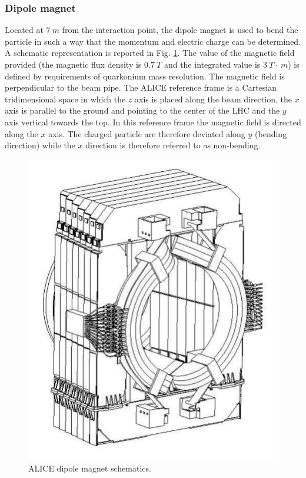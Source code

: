 \subsubsection{Dipole magnet}
Located at $7\ m$ from the interaction point, the dipole magnet is used to bend the particle in such a way that the momentum and electric charge can be determined.
A schematic representation is reported in Fig. \ref{fig:dipole}.
The value of the magnetic field provided (the magnetic flux density is $0.7\ T$ and the integrated value is $3\ T\cdot~m$) is defined by requirements of quarkonium mass resolution.
The magnetic field is perpendicular to the beam pipe.
The ALICE reference frame is a Cartesian tridimensional space in which the $z$ axis is placed along the beam direction, the $x$ axis is parallel to the ground and pointing to the center of the LHC and the $y$ axis vertical towards the top.
In this reference frame the magnetic field is directed along the $x$ axis. The charged particle are therefore deviated along $y$ (bending direction) while the $x$ direction is therefore referred to as non-bending.

\begin{figure}[!h]
\begin{center}
\includegraphics[width=0.6\linewidth]{Chapters/Introduction/Figs/dipole.pdf}
\caption{ALICE dipole magnet schematics.}
\label{fig:dipole}
\end{center}
\end{figure}

